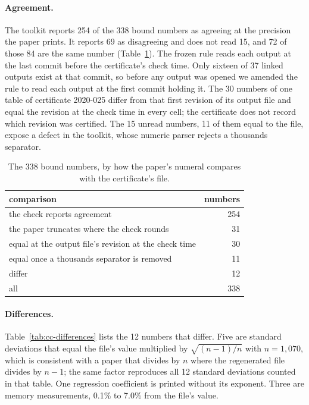 \paragraph{Agreement.} The toolkit reports 254 of the 338 bound numbers as agreeing at the
precision the paper prints. It reports 69 as disagreeing and does not read 15, and 72 of those
84 are the same number (Table~\ref{tab:cc-agreement}). The frozen rule reads each output at the last commit before the certificate's check time.
Only sixteen of 37 linked outputs exist at that commit, so before any output was opened we
amended the rule to read each output at the first commit holding it. The 30 numbers of one table of certificate
2020-025 differ from that first revision of its output file and equal the revision at the check
time in every cell; the certificate does not record which revision was certified. The 15 unread numbers, 11 of them equal to the file, expose a defect in the toolkit, whose
numeric parser rejects a thousands separator.

\vspace{0.5em}
\begin{table}[H]
\centering
\small
\caption{The 338 bound numbers, by how the paper's numeral compares with the certificate's
file.}
\label{tab:cc-agreement}
\begin{tabular}{@{}>{\raggedright\arraybackslash}p{}r@{}}
\toprule
comparison & numbers \\
\midrule
the check reports agreement & 254 \\
the paper truncates where the check rounds & 31 \\
equal at the output file's revision at the check time & 30 \\
equal once a thousands separator is removed & 11 \\
differ & 12 \\
\midrule
all & 338 \\
\bottomrule
\end{tabular}
\end{table}

\paragraph{Differences.} Table~\ref{tab:cc-differences} lists the 12 numbers that differ. Five
are standard deviations that equal the file's value multiplied by $\sqrt{(n-1)/n}$ with
$n = 1{,}070$, which is consistent with a paper that divides by $n$ where the regenerated file
divides by $n-1$; the same factor reproduces all 12 standard deviations counted in that table.
One regression coefficient is printed without its exponent. Three are memory measurements, 0.1\%
to 7.0\% from the file's value.

